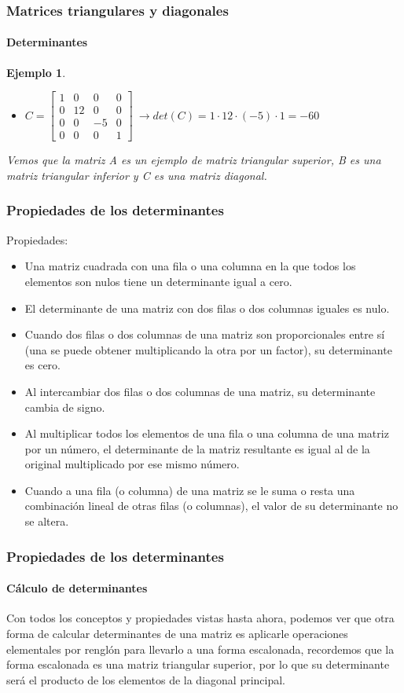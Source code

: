 \documentclass[11pt]{beamer}
\newtheorem{ejem}{Ejemplo}
\begin{document}
\begin{frame}
\frametitle{Matrices triangulares y diagonales}
\framesubtitle{Determinantes}
\begin{ejem}
\begin{itemize}
\item ${\displaystyle C = {\begin{bmatrix}1&0&0&0\\0&12&0&0\\0&0&-5&0\\0&0&0&1\end{bmatrix}}} ~ \rightarrow 
det(C) = 1 \cdot 12 \cdot (-5) \cdot 1 = -60$
\end{itemize}
Vemos que la matriz A es un ejemplo de matriz triangular superior, B es una matriz triangular inferior y C es una matriz diagonal.
\end{ejem}
\end{frame}

\begin{frame}
\frametitle{Propiedades de los determinantes}
Propiedades: \\
\begin{itemize}
\item Una matriz cuadrada con una fila o una columna en la que todos los elementos son nulos tiene un determinante igual a cero.
\item El determinante de una matriz con dos filas o dos columnas iguales es nulo.
\item Cuando dos filas o dos columnas de una matriz son proporcionales entre sí (una se puede obtener multiplicando la otra por un factor), su determinante es cero.
\item Al intercambiar dos filas o dos columnas de una matriz, su determinante cambia de signo.
\item Al multiplicar todos los elementos de una fila o una columna de una matriz por un número, el determinante de la matriz resultante es igual al de la original multiplicado por ese mismo número.
\item Cuando a una fila (o columna) de una matriz se le suma o resta una combinación lineal de otras filas (o columnas), el valor de su determinante no se altera.
\end{itemize}
\end{frame}

\begin{frame}
\frametitle{Propiedades de los determinantes}
\framesubtitle{Cálculo de determinantes}
Con todos los conceptos y propiedades vistas hasta ahora, podemos ver que otra forma de calcular determinantes de una matriz es aplicarle operaciones elementales por renglón para llevarlo a una forma escalonada, recordemos que la forma escalonada es una matriz triangular superior, por lo que su determinante será el producto de los elementos de la diagonal principal.
\end{frame}
\end{document}
